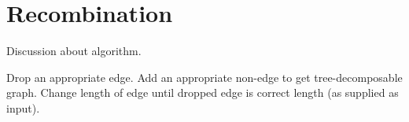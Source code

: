 \section{Recombination}

Discussion about algorithm.

Drop an appropriate edge. Add an appropriate non-edge to get tree-decomposable graph. Change length of edge until dropped edge is correct length (as supplied as input).
